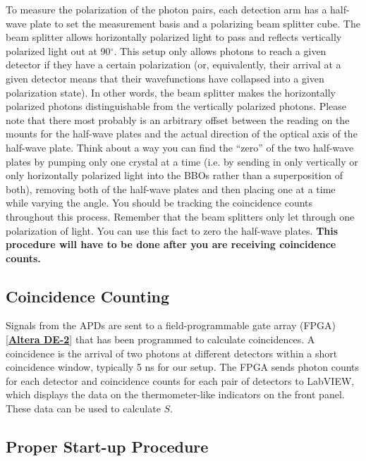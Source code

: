 \documentclass{../lab}
\begin{document}
To measure the polarization of the photon pairs, each detection arm has a half-wave plate to set the measurement basis and a polarizing beam splitter cube. The beam splitter allows horizontally polarized light to pass and reflects vertically polarized light out at 90$^\circ$. This setup only allows photons to reach a given detector if they have a certain polarization (or, equivalently, their arrival at a given detector means that their wavefunctions have collapsed into a given polarization state). In other words, the beam splitter makes the horizontally polarized photons distinguishable from the vertically polarized photons. Please note that there most probably is an arbitrary offset between the reading on the mounts for the half-wave plates and the actual direction of the optical axis of the half-wave plate. Think about a way you can find the ``zero'' of the two half-wave plates by pumping only one crystal at a time (i.e. by sending in only vertically or only horizontally polarized light into the BBOs rather than a superposition of both), removing both of the half-wave plates and then placing one at a time while varying the angle. You should be tracking the coincidence counts throughout this process. Remember that the beam splitters only let through one polarization of light. You can use this fact to zero the half-wave plates. \textbf{This procedure will have to be done after you are receiving coincidence counts. }

\subsection{Coincidence Counting}

Signals from the APDs are sent to a field-programmable gate array (FPGA) [\href{http://www.altera.com/education/univ/unv-index.html}{\textbf{Altera DE-2}}] that has been programmed to calculate coincidences. A coincidence is the arrival of two photons at different detectors within a short coincidence window, typically 5 ns for our setup. The FPGA sends photon counts for each detector and coincidence counts for each pair of detectors to LabVIEW, which displays the data on the thermometer-like indicators on the front panel. These data can be used to calculate $S$.

\subsection{Proper Start-up Procedure}
\end{document}
